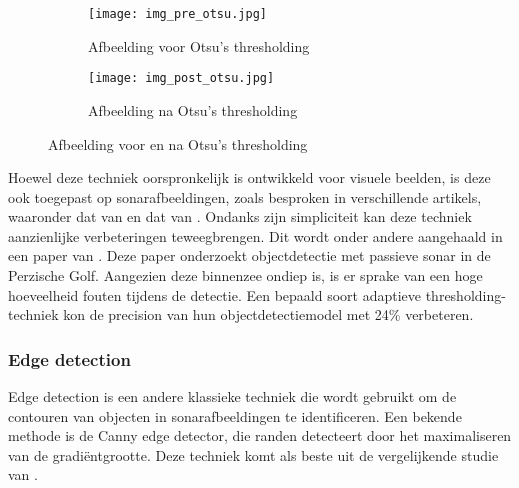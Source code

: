 \begin{figure}[H]
    \centering
    \begin{subfigure}{.5\textwidth}
        \centering
        \captionsetup{justification=centering}
        \texttt{[image: img\_pre\_otsu.jpg]}
        \caption[Afbeelding voor Otsu's thresholding]{Afbeelding voor Otsu's thresholding}
        \label{fig:img_pre_otsu}
    \end{subfigure}%
    \begin{subfigure}{.5\textwidth}
        \centering
        \captionsetup{justification=centering}
        \texttt{[image: img\_post\_otsu.jpg]}
        \caption[Afbeelding na Otsu's thresholding]{Afbeelding na Otsu's thresholding}
        \label{fig:img_post_otsu}
    \end{subfigure}
    \caption[Afbeelding voor en na Otsu's thresholding]{Afbeelding voor en na Otsu's thresholding}
    \label{fig:imgs_otsu}
\end{figure}

Hoewel deze techniek oorspronkelijk is ontwikkeld voor visuele beelden, is deze ook toegepast op sonarafbeeldingen, zoals besproken in verschillende artikels, waaronder dat van \textcite{Yuan_2016} en dat van \textcite{Dimitrova_Grekow_2017}. Ondanks zijn simpliciteit kan deze techniek aanzienlijke verbeteringen teweegbrengen. Dit wordt onder andere aangehaald in een paper van \textcite{Komari_Alaie_2018}. Deze paper onderzoekt objectdetectie met passieve sonar in de Perzische Golf. Aangezien deze binnenzee ondiep is, is er sprake van een hoge hoeveelheid fouten tijdens de detectie. Een bepaald soort adaptieve thresholding-techniek kon de \gls{precision} van hun objectdetectiemodel met 24\% verbeteren.

\subsubsection{Edge detection}

Edge detection is een andere klassieke techniek die wordt gebruikt om de contouren van objecten in sonarafbeeldingen te identificeren. \autocite{Torre_1986} Een bekende methode is de Canny edge detector, die randen detecteert door het maximaliseren van de gradiëntgrootte. Deze techniek komt als beste uit de vergelijkende studie van \textcite{Awalludin_2022}. \\

